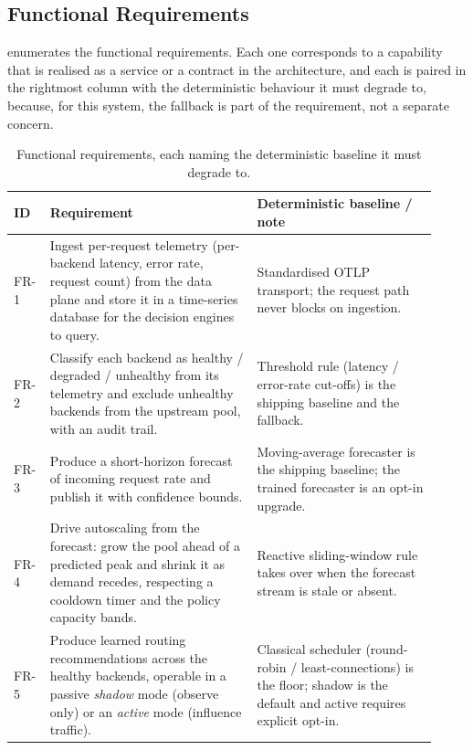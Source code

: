 \subsection{Functional Requirements}
\label{dsa:sec:reqs-functional}

 enumerates the functional requirements. Each one corresponds to a
capability that is realised as a service or a contract in the architecture, and each
is paired in the rightmost column with the deterministic behaviour it must degrade
to, because, for this system, the fallback is part of the requirement, not a
separate concern.

\begin{table}[p]
\centering
\caption[Functional requirements and their fallback baselines]{Functional requirements, each naming the deterministic baseline it must degrade to.}
\label{dsa:tab:fr}
\small
\renewcommand{\arraystretch}{1.25}
\begin{tabular}{@{}p{0.06\linewidth}p{0.46\linewidth}p{0.40\linewidth}@{}}
\toprule
\textbf{ID} & \textbf{Requirement} & \textbf{Deterministic baseline / note} \\
\midrule
FR-1 & Ingest per-request telemetry (per-backend latency, error rate, request count)
from the data plane and store it in a time-series database for the decision engines
to query. & Standardised OTLP transport; the request path never blocks on ingestion. \\
FR-2 & Classify each backend as healthy / degraded / unhealthy from its telemetry and
exclude unhealthy backends from the upstream pool, with an audit trail. & Threshold
rule (latency / error-rate cut-offs) is the shipping baseline and the fallback. \\
FR-3 & Produce a short-horizon forecast of incoming request rate and publish it with
confidence bounds. & Moving-average forecaster is the shipping baseline; the trained
forecaster is an opt-in upgrade. \\
FR-4 & Drive autoscaling from the forecast: grow the pool ahead of a predicted peak
and shrink it as demand recedes, respecting a cooldown timer and the policy capacity
bands. & Reactive sliding-window rule takes over when the forecast stream is stale or
absent. \\
FR-5 & Produce learned routing recommendations across the healthy backends, operable
in a passive \emph{shadow} mode (observe only) or an \emph{active} mode (influence
traffic). & Classical scheduler (round-robin / least-connections) is the floor;
shadow is the default and active requires explicit opt-in. \\

\end{tabular}
\end{table}
